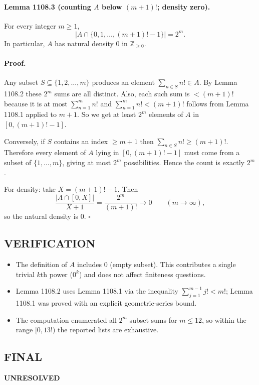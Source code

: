 \paragraph{Lemma 1108.3 (counting $A$ below $(m+1)!$; density zero).}
For every integer $m\ge 1$,
\[\left|A\cap\{0,1,\dots,(m+1)!-1\}\right| = 2^m.
\]
In particular, $A$ has natural density $0$ in $\mathbb{Z}_{\ge 0}$.

\paragraph{Proof.}
Any subset $S\subseteq\{1,2,\dots,m\}$ produces an element $\sum_{n\in S} n!\in A$.
By Lemma 1108.2 these $2^m$ sums are all distinct.
Also, each such sum is $< (m+1)!$ because it is at most $\sum_{n=1}^{m} n!$ and $\sum_{n=1}^{m} n! < (m+1)!$ follows from Lemma 1108.1 applied to $m+1$.
So we get at least $2^m$ elements of $A$ in $[0,(m+1)!-1]$.

Conversely, if $S$ contains an index $\ge m+1$ then $\sum_{n\in S} n!\ge (m+1)!$.
Therefore every element of $A$ lying in $[0,(m+1)!-1]$ must come from a subset of $\{1,\dots,m\}$, giving at most $2^m$ possibilities.
Hence the count is exactly $2^m$.

For density: take $X=(m+1)!-1$. Then
\[\frac{|A\cap[0,X]|}{X+1} = \frac{2^m}{(m+1)!} \to 0\qquad (m\to\infty),\]
so the natural density is $0$. \hfill $\square$

\subsection*{VERIFICATION}
\begin{itemize}
\item The definition of $A$ includes $0$ (empty subset). This contributes a single trivial $k$th power ($0^k$) and does not affect finiteness questions.
\item Lemma 1108.2 uses Lemma 1108.1 via the inequality $\sum_{j=1}^{m-1} j! < m!$; Lemma 1108.1 was proved with an explicit geometric-series bound.
\item The computation enumerated all $2^m$ subset sums for $m\le 12$, so within the range $[0,13!)$ the reported lists are exhaustive.
\end{itemize}

\subsection*{FINAL}
\textbf{UNRESOLVED}

